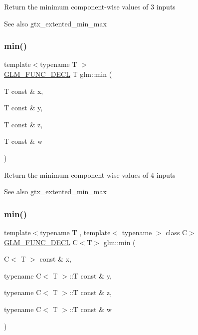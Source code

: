 Return the minimum component-\/wise values of 3 inputs \begin{DoxySeeAlso}{See also}
gtx\+\_\+extented\+\_\+min\+\_\+max 
\end{DoxySeeAlso}
\mbox{\label{group__gtx__extended__min__max_ga95466987024d03039607f09e69813d69}} 
\subsubsection{\texorpdfstring{min()}{min()}\hspace{0.1cm}{\footnotesize\ttfamily [4/6]}}
{\footnotesize\ttfamily template$<$typename T $>$ \\
\mbox{\hyperlink{setup_8hpp_ab2d052de21a70539923e9bcbf6e83a51}{G\+L\+M\+\_\+\+F\+U\+N\+C\+\_\+\+D\+E\+CL}} T glm\+::min (\begin{DoxyParamCaption}\item[{T const \&}]{x,  }\item[{T const \&}]{y,  }\item[{T const \&}]{z,  }\item[{T const \&}]{w }\end{DoxyParamCaption})}

Return the minimum component-\/wise values of 4 inputs \begin{DoxySeeAlso}{See also}
gtx\+\_\+extented\+\_\+min\+\_\+max 
\end{DoxySeeAlso}
\mbox{\label{group__gtx__extended__min__max_ga4fe35dd31dd0c45693c9b60b830b8d47}} 
\subsubsection{\texorpdfstring{min()}{min()}\hspace{0.1cm}{\footnotesize\ttfamily [5/6]}}
{\footnotesize\ttfamily template$<$typename T , template$<$ typename $>$ class C$>$ \\
\mbox{\hyperlink{setup_8hpp_ab2d052de21a70539923e9bcbf6e83a51}{G\+L\+M\+\_\+\+F\+U\+N\+C\+\_\+\+D\+E\+CL}} C$<$T$>$ glm\+::min (\begin{DoxyParamCaption}\item[{C$<$ T $>$ const \&}]{x,  }\item[{typename C$<$ T $>$\+::T const \&}]{y,  }\item[{typename C$<$ T $>$\+::T const \&}]{z,  }\item[{typename C$<$ T $>$\+::T const \&}]{w }\end{DoxyParamCaption})}


